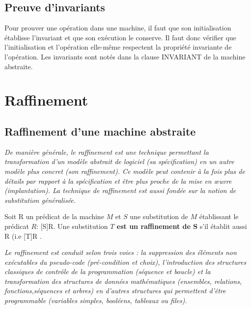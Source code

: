 \documentclass[10pt,a4paper]{article}
\begin{document}
\subsection{Preuve d'invariants}


Pour prouver une opération dans une machine, il faut que son initialisation établisse l’invariant et que son exécution le conserve. Il faut donc vérifier que l’initialisation et l’opération elle-même respectent la propriété invariante de l’opération. Les invariants sont notés dans la clause INVARIANT de la machine abstraite. 

\section{Raffinement}

\subsection{Raffinement d'une machine abstraite}
\emph{De manière générale, le raffinement est une technique permettant la transformation d’un modèle abstrait de logiciel (sa spécification) en un autre modèle plus concret (son raffinement). Ce modèle peut contenir à la fois plus de détails par rapport à la spécification et être plus proche de la mise en œuvre (implantation). La technique de raffinement est aussi fondée sur la notion de substitution généralisée.}\cite{dossierTechnique}

\iffalse
Un raffinement peut utiliser une substitution T si T peut remplacer S sans que « l’utilisateur » de la machine ne s’en aperçoive. Cela signifie que tout ce qui est attendu de S sera rempli par T. On dit
alors que T est le raffinement de S ou que S est une abstraction de T.
\fi

Soit R un prédicat de la machine $M$ et $S$ une substitution de $M$ établissant le prédicat $R$: [S]R.
Une substitution \textbf{$T$ est un raffinement de S} s'il établit aussi R (i.e [T]R .

\emph{Le raffinement est conduit selon trois voies : la suppression des éléments non exécutables du pseudo-code (pré-condition et choix), l’introduction des structures classiques de contrôle de la programmation (séquence et boucle) et la transformation des structures de données mathématiques (ensembles, relations, fonctions,séquences et arbres) en d’autres structures qui permettent d’être programmable (variables simples, booléens, tableaux ou files).}\cite{dossierTechnique}
\end{document}
